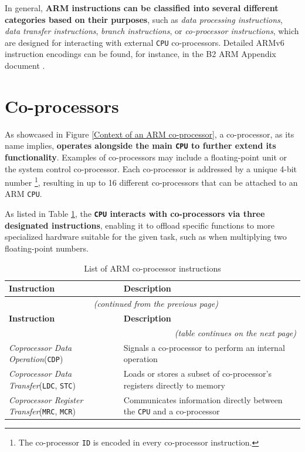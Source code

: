 \documentclass[english, ing, kiv, he, iso690numb, pdf]{fasthesis}
\begin{document}
	In general, \textbf{ARM instructions can be classified into several different categories based on their purposes}, such as \textit{data processing instructions}, \textit{data transfer instructions}, \textit{branch instructions}, or \textit{co-processor instructions}, which are designed for interacting with external \texttt{CPU} co-processors. Detailed ARMv6 instruction encodings can be found, for instance, in the B2 ARM Appendix document \cite{B2_appendix}.
	
	\section{Co-processors}
	
	As showcased in Figure \ref{Context of an ARM co-processor}, a co-processor, as its name implies, \textbf{operates alongside the main \texttt{CPU} to further extend its functionality}. Examples of co-processors may include a floating-point unit or the system control co-processor. Each co-processor is addressed by a unique 4-bit number \footnote{The co-processor \texttt{ID} is encoded in every co-processor instruction.}, resulting in up to 16 different co-processors that can be attached to an ARM \texttt{CPU}.
	
	As listed in Table \ref{List of ARM co-processor instructions}, the \textbf{\texttt{CPU} interacts with co-processors via three designated instructions}, enabling it to offload specific functions to more specialized hardware suitable for the given task, such as when multiplying two floating-point numbers.
	
	\begin{center}
		\begin{longtable}{p{}p{}}
			\caption{List of ARM co-processor instructions}
			\label{List of ARM co-processor instructions}\\
			\toprule[1.5pt]
			\textbf{Instruction} & \textbf{Description}\\
			\midrule
			\endfirsthead
			\multicolumn{2}{c}{\tablename{}~\thetable{} \textit{(continued from the previous page)}}\\
			\midrule
			\textbf{Instruction} & \textbf{Description}\\
			\midrule
			\endhead
			\midrule
			\multicolumn{2}{r}{\textit{(table continues on the next page)}}\\
			\endfoot
			\bottomrule[1.5pt]
			\endlastfoot
			\textit{Coprocessor Data Operation}\newline(\texttt{CDP}) & Signals a co-processor to perform an internal operation\\
			\textit{Coprocessor Data Transfer}\newline(\texttt{LDC}, \texttt{STC}) & Loads or stores a subset of co-processor's registers directly to memory\\
			\textit{Coprocessor Register Transfer}\newline(\texttt{MRC}, \texttt{MCR}) & Communicates information directly between the \texttt{CPU} and a co-processor\\
		\end{longtable}
	\end{center}
	
\end{document}
